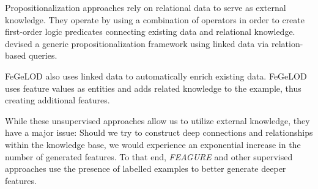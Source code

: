 \documentclass{article}
\theoremstyle{definition}
\begin{document}
	 Propositionalization approaches \citep{kramer2000bottom,cheng2011automatedfull} rely on relational data to serve as external knowledge. They operate by using a combination of operators in order to create first-order logic predicates connecting existing data and relational knowledge. 
	\cite{cheng2011automatedfull} devised a generic propositionalization framework  using linked data via relation-based queries. 
	
	 FeGeLOD \citep{paulheim2012unsupervisedfull} also uses linked data to automatically enrich existing data. 
	FeGeLOD uses feature values as entities and adds related knowledge to the example, thus creating additional features. 
	
	While these unsupervised approaches allow us to utilize external knowledge, they have a major issue: Should we try to construct deep connections and relationships within the knowledge base, we would experience an exponential increase in the number of generated features.
	To that end, \emph{FEAGURE} and other supervised approaches use the presence of labelled examples to better generate deeper features.
	
\end{document}
